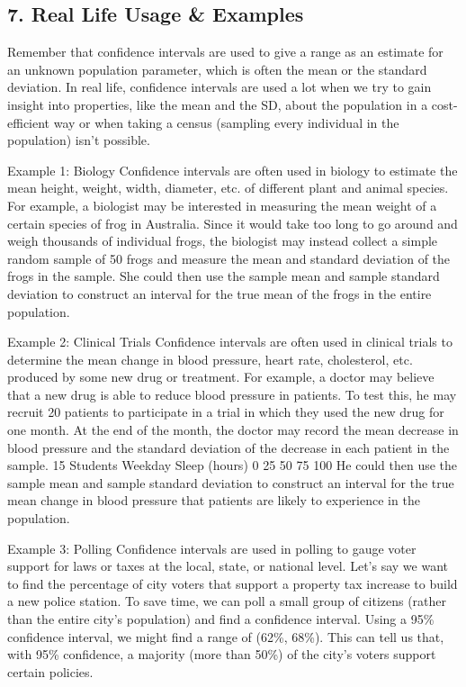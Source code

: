 \documentclass[
]{article}
\begin{document}
\hypertarget{real-life-usage-examples}{%
\subsection{7. Real Life Usage \&
Examples}\label{real-life-usage-examples}}

Remember that confidence intervals are used to give a range as an
estimate for an unknown population parameter, which is often the mean or
the standard deviation. In real life, confidence intervals are used a
lot when we try to gain insight into properties, like the mean and the
SD, about the population in a cost-efficient way or when taking a census
(sampling every individual in the population) isn't possible.

Example 1: Biology Confidence intervals are often used in biology to
estimate the mean height, weight, width, diameter, etc. of different
plant and animal species. For example, a biologist may be interested in
measuring the mean weight of a certain species of frog in Australia.
Since it would take too long to go around and weigh thousands of
individual frogs, the biologist may instead collect a simple random
sample of 50 frogs and measure the mean and standard deviation of the
frogs in the sample. She could then use the sample mean and sample
standard deviation to construct an interval for the true mean of the
frogs in the entire population.

Example 2: Clinical Trials Confidence intervals are often used in
clinical trials to determine the mean change in blood pressure, heart
rate, cholesterol, etc. produced by some new drug or treatment. For
example, a doctor may believe that a new drug is able to reduce blood
pressure in patients. To test this, he may recruit 20 patients to
participate in a trial in which they used the new drug for one month. At
the end of the month, the doctor may record the mean decrease in blood
pressure and the standard deviation of the decrease in each patient in
the sample. 15 Students Weekday Sleep (hours) 0 25 50 75 100 He could
then use the sample mean and sample standard deviation to construct an
interval for the true mean change in blood pressure that patients are
likely to experience in the population.

Example 3: Polling Confidence intervals are used in polling to gauge
voter support for laws or taxes at the local, state, or national level.
Let's say we want to find the percentage of city voters that support a
property tax increase to build a new police station. To save time, we
can poll a small group of citizens (rather than the entire city's
population) and find a confidence interval. Using a 95\% confidence
interval, we might find a range of (62\%, 68\%). This can tell us that,
with 95\% confidence, a majority (more than 50\%) of the city's voters
support certain policies.
\end{document}
